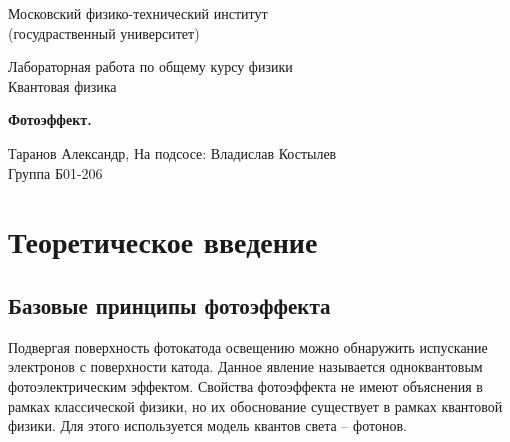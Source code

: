 \documentclass[a4paper, 12pt]{article} %
\begin{document}
	
	\begin{titlepage}
		
		\newpage
		\begin{center}
			\normalsize Московский физико-технический институт \\(госудраственный университет)
		\end{center}
		
		\vspace{6em}
		
		\begin{center}
			\Large Лабораторная работа по общему курсу физики\\Квантовая физика
		\end{center}
		
		\vspace{1em}
		
		\begin{center}
			\Large \textbf{Фотоэффект.}
		\end{center}
		
		\vspace{2em}
		
		\begin{center}
			\large Таранов Александр, На подсосе: Владислав Костылев \\
			Группа Б01-206
		\end{center}
		
		\vspace{\fill}
		
	\end{titlepage}
	
	
	
	\thispagestyle{empty}
	\newpage
	\tableofcontents
	\newpage
	\setcounter{page}{1}

	\section{Теоретическое введение}
	
	\subsection{Базовые принципы фотоэффекта}
	
	Подвергая поверхность фотокатода освещению можно обнаружить испускание электронов с поверхности катода. Данное явление называется одноквантовым фотоэлектрическим эффектом.
	Свойства фотоэффекта не имеют объяснения в рамках классической физики, но их обоснование существует в рамках квантовой физики. Для этого используется модель квантов света -- фотонов.
	
\end{document}
